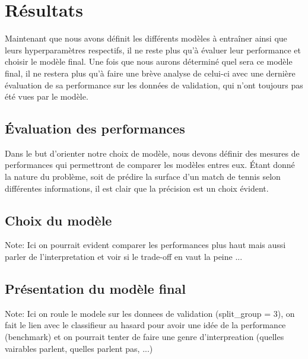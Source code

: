 \section{Résultats}
Maintenant que nous avons définit les différents modèles à entraîner ainsi que leurs hyperparamètres respectifs, il ne reste plus qu'à évaluer leur performance et choisir le modèle final. Une fois que nous aurons déterminé quel sera ce modèle final, il ne restera plus qu'à faire une brève analyse de celui-ci avec une dernière évaluation de sa performance sur les données de validation, qui n'ont toujours pas été vues par le modèle.  

\subsection{Évaluation des performances}
Dans le but d'orienter notre choix de modèle, nous devons définir des mesures de performances qui permettront de comparer les modèles entres eux. Étant donné la nature du problème, soit de prédire la surface d'un match de tennis selon différentes informations, il est clair que la précision est un choix évident. 

\subsection{Choix du modèle}
Note: Ici on pourrait evident comparer les performances plus haut mais aussi parler de l'interpretation et voir si le trade-off en vaut la peine ...

\subsection{Présentation du modèle final}
Note: Ici on roule le modele sur les donnees de validation (split_group = 3), on fait le lien avec le classifieur au hasard pour avoir une idée de la performance (benchmark) et on pourrait tenter de faire une genre d'interpreation (quelles vairables parlent, quelles parlent pas, ...)